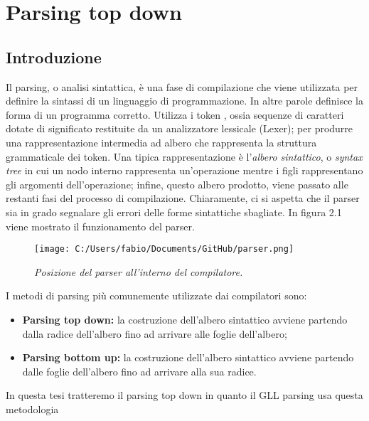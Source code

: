 \chapter{Parsing top down}
\section{Introduzione}
Il parsing, o analisi sintattica, è una fase di compilazione  che viene utilizzata per definire la sintassi di un linguaggio di programmazione. In altre parole definisce la forma di un programma corretto. Utilizza i token \cite{libro: compilatori}, ossia sequenze di caratteri dotate di significato restituite da un analizzatore lessicale (Lexer); per produrre una rappresentazione intermedia ad albero che rappresenta la struttura grammaticale dei token. Una tipica rappresentazione è l'\textit{albero sintattico}, o \textit{syntax tree} in cui un nodo interno rappresenta un'operazione mentre i figli rappresentano gli argomenti dell'operazione; infine, questo albero prodotto, viene passato alle restanti fasi del processo di compilazione. Chiaramente, ci si aspetta che il parser sia in grado segnalare gli errori delle forme sintattiche sbagliate. In figura 2.1 viene mostrato il funzionamento del parser.
\par
\vspace{0.5mm}
\begin{figure}[hbpb]\label{figParser}
	{\texttt{[image: C:/Users/fabio/Documents/GitHub/parser.png]}}
	\caption{\textit{Posizione del parser all'interno del compilatore.}}
\end{figure}
I metodi di parsing più comunemente utilizzate dai compilatori sono:
\begin{itemize}
	\item \textbf{Parsing top down: }la costruzione dell'albero sintattico avviene partendo dalla radice dell'albero fino ad arrivare alle foglie dell'albero;
	\item \textbf{Parsing bottom up: }la costruzione dell'albero sintattico avviene partendo dalle foglie dell'albero fino ad arrivare alla sua radice.
\end{itemize}
In questa tesi tratteremo il parsing top down in quanto il GLL parsing usa questa metodologia
